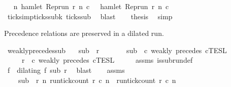 \begin{isabellebody}
\ \isamarkupfalse%
\ {\isacartoucheopen}{\isasymforall}n{\isachardot}\ hamlet\ {\isacharparenleft}{\isacharparenleft}Rep{\isacharunderscore}run\ r{\isacharparenright}\ n\ c\ {\isasymlongrightarrow}\ {\isasymnot}\ hamlet\ {\isacharparenleft}{\isacharparenleft}Rep{\isacharunderscore}run\ r{\isacharparenright}\ n\ c\isanewline
\ \ \ \ \isamarkupfalse%
\ ticks{\isacharunderscore}imp{\isacharunderscore}ticks{\isacharunderscore}subk\ ticks{\isacharunderscore}sub\ \isamarkupfalse%
\ blast\isanewline
\ \ \isamarkupfalse%
\ {\isacharquery}thesis\ \isamarkupfalse%
\ simp\isanewline
{}\isamarkupfalse%
%
\endisatagproof
{\isafoldproof}%
%
\isadelimproof
%
\endisadelimproof
%
\begin{isamarkuptext}%
Precedence relations are preserved in a dilated run.%
\end{isamarkuptext}\isamarkuptrue%
\isamarkupfalse%
\ weakly{\isacharunderscore}precedes{\isacharunderscore}sub{\isacharcolon}\isanewline
\ \ \ {\isacartoucheopen}sub\ {\isasymlless}\ r{\isacartoucheclose}\isanewline
\ \ \ \ \ \ \ {\isacartoucheopen}sub\ {\isasymin}\ {\isasymlbrakk}c\ weakly\ precedes\ c\isactrlsub T\isactrlsub E\isactrlsub S\isactrlsub L{\isacartoucheclose}\isanewline
\ \ \ \ \ {\isacartoucheopen}r\ {\isasymin}\ {\isasymlbrakk}c\ weakly\ precedes\ c\isactrlsub T\isactrlsub E\isactrlsub S\isactrlsub L{\isacartoucheclose}\isanewline
%
\isadelimproof
%
\endisadelimproof
%
\isatagproof
{}\isamarkupfalse%
\ {\isacharminus}\isanewline
\ \ \isamarkupfalse%
\ assms{\isacharparenleft}{}{\isacharparenright}\ is{\isacharunderscore}subrun{\isacharunderscore}def\ \isamarkupfalse%
\ f\ \ {\isacharasterisk}{\isacharcolon}{\isacartoucheopen}dilating\ f\ sub\ r{\isacartoucheclose}\ \isamarkupfalse%
\ blast\isanewline
\ \ \isamarkupfalse%
\ assms{\isacharparenleft}{}{\isacharparenright}\ \isamarkupfalse%
\isanewline
\ \ \ \ {\isacartoucheopen}sub\ {\isasymin}\ {\isacharbraceleft}r{\isachardot}\ {\isasymforall}n{\isachardot}\ {\isacharparenleft}run{\isacharunderscore}tick{\isacharunderscore}count\ r\ c\ n{\isacharparenright}\ {\isasymle}\ {\isacharparenleft}run{\isacharunderscore}tick{\isacharunderscore}count\ r\ c\ n{\isacharparenright}{\isacharbraceright}{\isacartoucheclose}\ \isamarkupfalse%

\end{isabellebody}
